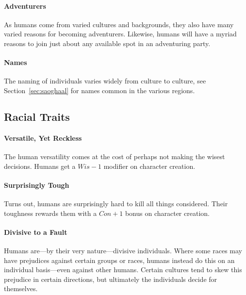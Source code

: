 \paragraph{Adventurers}
As humans come from varied cultures and backgrounds, they also have many varied reasons for becoming adventurers.
Likewise, humans will have a myriad reasons to join just about any available spot in an adventuring party.

\paragraph{Names}
The naming of individuals varies widely from culture to culture, see Section~\ref{sec:saoghaal} for names common in the various regions.

\subsection{Racial Traits}
\paragraph{Versatile, Yet Reckless}
The human versatility comes at the cost of perhaps not making the wisest decisions.
Humans get a $Wis -1$ modifier on character creation.

\paragraph{Surprisingly Tough}
Turns out, humans are surprisingly hard to kill all things considered.
Their toughness rewards them with a $Con+1$ bonus on character creation.

\paragraph{Divisive to a Fault}
Humans are---by their very nature---divisive individuals.
Where some races may have prejudices against certain groups or races, humans instead do this on an individual basis---even against other humans.
Certain cultures tend to skew this prejudice in certain directions, but ultimately the individuals decide for themselves.